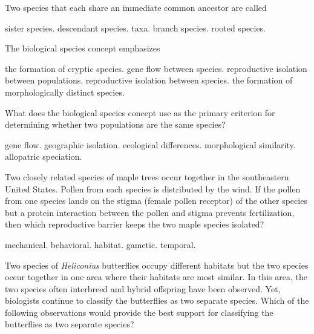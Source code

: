 \question
Two species that each share an immediate common ancestor are called

\begin{choices}
\correctchoice sister species. %
\choice descendant species. %
\choice taxa. %
\choice branch species. %
\choice rooted species. %
\end{choices}

\question
The biological species concept emphasizes

\begin{choices}
\choice the formation of cryptic species.%
\choice gene flow between species.%
\choice reproductive isolation between populations.%
\choice reproductive isolation between species.%
\choice the formation of morphologically distinct species.%
\end{choices}

\question
What does the biological species concept use as the primary criterion for determining whether two populations are the same species?

\begin{choices}
\correctchoice gene flow.   %
\choice geographic isolation.   %
\choice ecological differences.   %
\choice morphological similarity.   %
\choice allopatric speciation.   %
\end{choices}



\question
Two closely related species of maple trees occur together in the southeastern United States.  Pollen from each species is distributed by the wind.  If the pollen from one species lands on the stigma (female pollen receptor) of the other species but a protein interaction between the pollen and stigma prevents fertilization, then which reproductive barrier keeps the two maple species isolated?

\begin{choices}
\choice mechanical.%
\choice behavioral.%
\choice habitat.%
\correctchoice gametic.%
\choice temporal.%
\end{choices}

\question
Two species of \textit{Heliconius} butterflies occupy different habitats but the two species occur together in one area where their habitats are most similar. In this area, the two species often interbreed and hybrid offspring have been observed.  Yet, biologists continue to classify the butterflies as two separate species.  Which of the following observations would provide the best support for classifying the butterflies as two separate species? 

